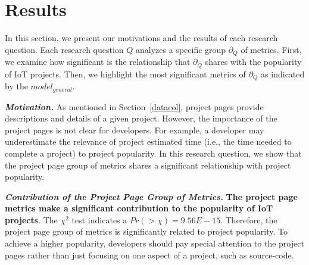 \section{Results}\label{section:results}

In this section, we present our motivations and the results of each research question. Each research
question $Q$ analyzes a specific group $\partial_Q$ of metrics. First, we examine how significant is the relationship that $\partial_Q$ shares with the popularity of IoT projects.
Then, we highlight the most significant metrics of $\partial_Q$ as indicated by the $model_{general}$.



\noindent\textbf{\RQone}



\vspace{0.1cm}

\noindent\textbf{\textit{Motivation.}}
As mentioned in Section~\ref{datacol}, project pages provide descriptions and details of a given project. However, the importance of the project pages is not clear for developers. For example, a developer may underestimate the relevance of project estimated time (i.e., the time needed to complete a project) to project popularity. In this research question, we show that the project page group of metrics shares a significant relationship with project popularity.



\vspace{0.1cm}




 

% 

\noindent\textbf{\textit{Contribution of the Project Page Group of Metrics.}} \textbf{The project page metrics make a significant contribution to the popularity of IoT projects}. The $\chi^2$ test indicates a $Pr(>\chi)=9.56E-15$.
Therefore, the project page group of metrics is significantly related to project popularity. To achieve a higher popularity, developers should pay special attention to the project pages rather than just focusing on one aspect of a project, such as source-code.

\vspace{0.1cm}

